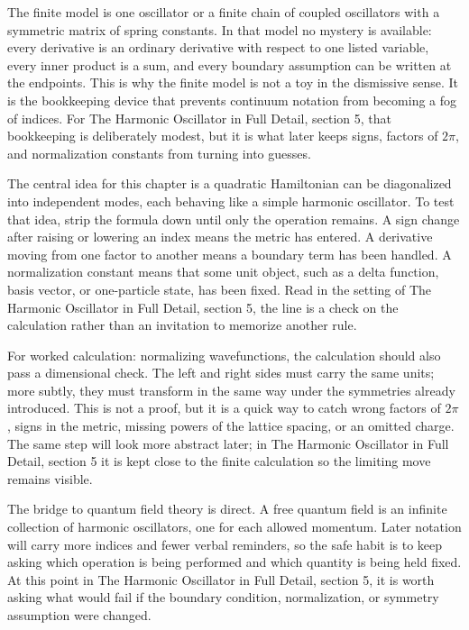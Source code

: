The finite model is one oscillator or a finite chain of coupled oscillators with a symmetric matrix of spring constants.  In that model no mystery is available: every derivative is an ordinary derivative with respect to one listed variable, every inner product is a sum, and every boundary assumption can be written at the endpoints.  This is why the finite model is not a toy in the dismissive sense.  It is the bookkeeping device that prevents continuum notation from becoming a fog of indices.  For The Harmonic Oscillator in Full Detail, section 5, that bookkeeping is deliberately modest, but it is what later keeps signs, factors of \(2\pi\), and normalization constants from turning into guesses.

The central idea for this chapter is a quadratic Hamiltonian can be diagonalized into independent modes, each behaving like a simple harmonic oscillator.  To test that idea, strip the formula down until only the operation remains.  A sign change after raising or lowering an index means the metric has entered.  A derivative moving from one factor to another means a boundary term has been handled.  A normalization constant means that some unit object, such as a delta function, basis vector, or one-particle state, has been fixed.  Read in the setting of The Harmonic Oscillator in Full Detail, section 5, the line is a check on the calculation rather than an invitation to memorize another rule.

For worked calculation: normalizing wavefunctions, the calculation should also pass a dimensional check.  The left and right sides must carry the same units; more subtly, they must transform in the same way under the symmetries already introduced.  This is not a proof, but it is a quick way to catch wrong factors of \(2\pi\), signs in the metric, missing powers of the lattice spacing, or an omitted charge.  The same step will look more abstract later; in The Harmonic Oscillator in Full Detail, section 5 it is kept close to the finite calculation so the limiting move remains visible.

The bridge to quantum field theory is direct.  A free quantum field is an infinite collection of harmonic oscillators, one for each allowed momentum.  Later notation will carry more indices and fewer verbal reminders, so the safe habit is to keep asking which operation is being performed and which quantity is being held fixed.  At this point in The Harmonic Oscillator in Full Detail, section 5, it is worth asking what would fail if the boundary condition, normalization, or symmetry assumption were changed.


